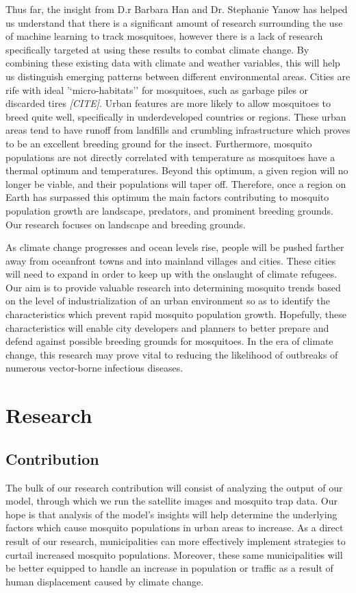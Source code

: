 \documentclass[11pt]{article}
\begin{document}
Thus far, the insight from D.r Barbara Han and Dr. Stephanie Yanow has helped us understand that there is a significant amount of research surrounding the use of machine learning to track mosquitoes, however there is a lack of research specifically targeted at using these results to combat climate change. By combining these existing data with climate and weather variables, this will help us distinguish emerging patterns between different environmental areas. Cities are rife with ideal '‘micro-habitats’' for mosquitoes, such as garbage piles or discarded tires \textit{[CITE]}. Urban features are more likely to allow mosquitoes to breed quite well, specifically in underdeveloped countries or regions. These urban areas tend to have runoff from landfills and crumbling infrastructure which proves to be an excellent breeding ground for the insect. Furthermore, mosquito populations are not directly correlated with temperature as mosquitoes have a thermal optimum and temperatures. Beyond this optimum, a given region will no longer be viable, and their populations will taper off. Therefore, once a region on Earth has surpassed this optimum the main factors contributing to mosquito population growth are landscape, predators, and prominent breeding grounds. Our research focuses on landscape and breeding grounds.

As climate change progresses and ocean levels rise, people will be pushed farther away from oceanfront towns and into mainland villages and cities. These cities will need to expand in order to keep up with the onslaught of climate refugees. Our aim is to provide valuable research into determining mosquito trends based on the level of industrialization of an urban environment so as to identify the characteristics which prevent rapid mosquito population growth. Hopefully, these characteristics will enable city developers and planners to better prepare and defend against possible breeding grounds for mosquitoes. In the era of climate change, this research may prove vital to reducing the likelihood of outbreaks of numerous vector-borne infectious diseases.

\section{Research}
\subsection{Contribution}
The bulk of our research contribution will consist of analyzing the output of our model, through which we run the satellite images and mosquito trap data. Our hope is that analysis of the model’s insights will help determine the underlying factors which cause mosquito populations in urban areas to increase. As a direct result of our research, municipalities can more effectively implement strategies to curtail increased mosquito populations. Moreover, these same municipalities will be better equipped to handle an increase in population or traffic as a result of human displacement caused by climate change.
\end{document}
